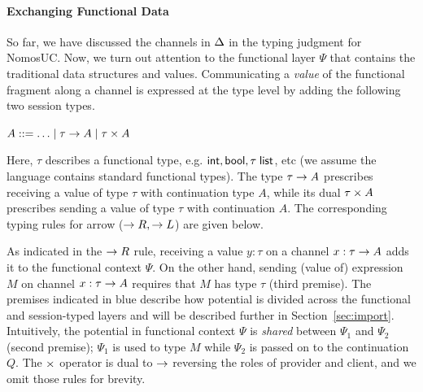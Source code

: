 \paragraph*{\textbf{Exchanging Functional Data}}
So far, we have discussed the channels in $\Delta$ in the typing judgment for NomosUC.
Now, we turn out attention to the functional layer $\Psi$ that contains the
traditional data structures and values.
Communicating a \emph{value} of the functional fragment along a channel
is expressed at the type level by adding the following two session types.
\begin{center}
\begin{minipage}{0cm}
\begin{tabbing}
$A ::= \ldots \mid \tau \rightarrow A \mid \tau \times A$
\end{tabbing}
\end{minipage}
\end{center}
Here, $\tau$ describes a functional type, e.g. $\mathsf{int}, \mathsf{bool}, \tau \; \mathsf{list}$, etc
(we assume the language contains standard functional types).
The type $\tau \rightarrow A$ prescribes receiving a value of type $\tau$
with continuation type $A$, while its dual $\tau \times A$ prescribes
sending a value of type $\tau$ with continuation $A$. The corresponding
typing rules for arrow ($\rightarrow R, \rightarrow L$) are given below.
As indicated in the $\rightarrow R$ rule, receiving a value $y : \tau$ on a channel
$x : \tau \rightarrow A$ adds it to the functional context $\Psi$. On the
other hand, sending (value of) expression $M$ on channel $x : \tau \rightarrow A$
requires that $M$ has type $\tau$ (third premise).
The premises indicated in blue describe how potential is divided across
the functional and session-typed layers and will be described further in Section~\ref{sec:import}.
Intuitively, the potential in functional context $\Psi$ is \emph{shared}
between $\Psi_1$ and $\Psi_2$ (second premise); $\Psi_1$ is used to type
$M$ while $\Psi_2$ is passed on to the continuation $Q$.
The $\times$ operator is dual to $\rightarrow$ reversing the roles of provider and client,
and we omit those rules for brevity.

